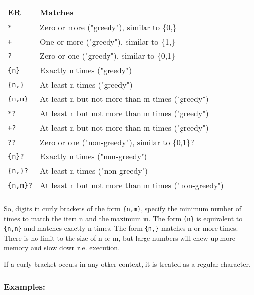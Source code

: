 \begin{footnotesize}
  \begin{tabularx}{\textwidth}{>{\hsize=0.3\hsize}X>{\hsize=0.7\hsize}X}\\
    \hline
    \textbf{ER} & \textbf{Matches} \\
    \hline
    \texttt{*} & Zero or more ("greedy"), similar to \{0,\} \\
    \texttt{+} & One or more ("greedy"), similar to \{1,\} \\
    \texttt{?} & Zero or one ("greedy"), similar to \{0,1\} \\
    \texttt{\{n\}} & Exactly n times ("greedy") \\
    \texttt{\{n,\}} & At least n times ("greedy") \\
    \texttt{\{n,m\}} & At least n but not more than m times ("greedy") \\
    \texttt{*?} & At least n but not more than m times ("greedy") \\
    \texttt{+?} & At least n but not more than m times ("greedy") \\
    \texttt{??} & Zero or one ("non-greedy"), similar to \{0,1\}? \\
    \texttt{\{n\}?} & Exactly n times ("non-greedy") \\
    \texttt{\{n,\}?} & At least n times ("non-greedy") \\
    \texttt{\{n,m\}?} & At least n but not more than m times ("non-greedy") \\
    \hline
    \\
  \end{tabularx}
\end{footnotesize}

So, digits in curly brackets of the form \texttt{\{n,m\}}, specify the
minimum number of times to match the item n and the maximum m. The form
\texttt{\{n\}} is equivalent to \texttt{\{n,n\}} and matches exactly n
times. The form \texttt{\{n,\}} matches n or more times. There is no
limit to the size of n or m, but large numbers will chew up more memory
and slow down r.e. execution.

If a curly bracket occurs in any other context, it is treated as a
regular character.


\subsubsection{Examples:}

